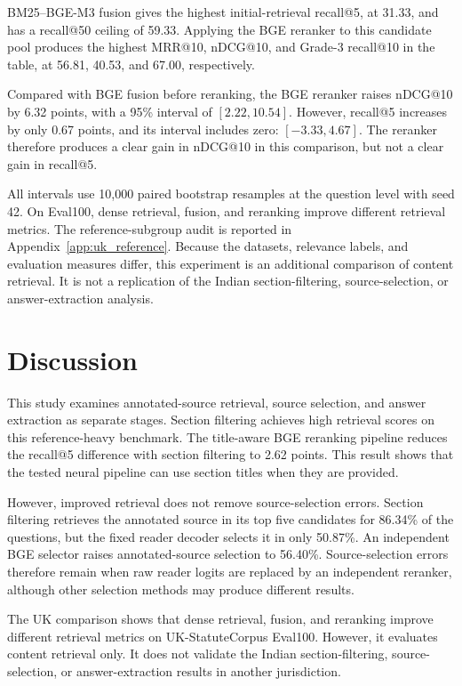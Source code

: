 \documentclass[pdflatex,sn-basic]{sn-jnl}%
\theoremstyle{thmstyleone}%
\theoremstyle{thmstyletwo}%
\theoremstyle{thmstylethree}%
\begin{document}
BM25--BGE-M3 fusion gives the highest initial-retrieval recall@5, at 31.33,
and has a recall@50 ceiling of 59.33. Applying the BGE reranker to this
candidate pool produces the highest MRR@10, nDCG@10, and Grade-3 recall@10
in the table, at 56.81, 40.53, and 67.00, respectively.

Compared with BGE fusion before reranking, the BGE reranker raises nDCG@10
by 6.32 points, with a 95\% interval of $[2.22,10.54]$. However, recall@5
increases by only 0.67 points, and its interval includes zero:
$[-3.33,4.67]$. The reranker therefore produces a clear gain in nDCG@10 in
this comparison, but not a clear gain in recall@5.

All intervals use 10,000 paired bootstrap resamples at the question level
with seed 42. On Eval100, dense retrieval, fusion, and reranking improve
different retrieval metrics. The reference-subgroup audit is reported in
Appendix~\ref{app:uk_reference}. Because the datasets, relevance labels, and
evaluation measures differ, this experiment is an additional comparison of
content retrieval. It is not a replication of the Indian section-filtering,
source-selection, or answer-extraction analysis.

\FloatBarrier

\section{Discussion}
\label{sec:discussion}

This study examines annotated-source retrieval, source selection, and answer
extraction as separate stages. Section filtering achieves high retrieval
scores on this reference-heavy benchmark. The title-aware BGE reranking
pipeline reduces the recall@5 difference with section filtering to 2.62
points. This result shows that the tested neural pipeline can use section
titles when they are provided.

However, improved retrieval does not remove source-selection errors. Section
filtering retrieves the annotated source in its top five candidates for
86.34\% of the questions, but the fixed reader decoder selects it in only
50.87\%. An independent BGE selector raises annotated-source selection to
56.40\%. Source-selection errors therefore remain when raw reader logits are
replaced by an independent reranker, although other selection methods may
produce different results.

The UK comparison shows that dense retrieval, fusion, and reranking improve
different retrieval metrics on UK-StatuteCorpus Eval100. However, it evaluates
content retrieval only. It does not validate the Indian section-filtering,
source-selection, or answer-extraction results in another jurisdiction.
\end{document}
